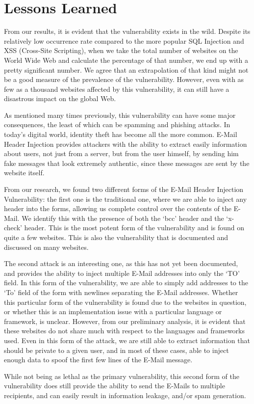 \section{Lessons Learned}
    From our results, it is evident that the vulnerability exists in the wild. Despite its relatively low occurrence rate compared to the more popular SQL Injection and XSS (Cross-Site Scripting), when we take the total number of websites on the World Wide Web and calculate the percentage of that number, we end up with a pretty significant number. We agree that an extrapolation of that kind might not be a good measure of the prevalence of the vulnerability. However, even with as few as a thousand websites affected by this vulnerability, it can still have a disastrous impact on the global Web. 
    
    As mentioned many times previously, this vulnerability can have some major consequences, the least of which can be spamming and phishing attacks. In today's digital world, identity theft has become all the more common. E-Mail Header Injection provides attackers with the ability to extract easily information about users, not just from a server, but from the user himself, by sending him fake messages that look extremely authentic, since these messages are sent by the website itself.
    
    From our research, we found two different forms of the E-Mail Header Injection Vulnerability: the first one is the traditional one, where we are able to inject any header into the forms, allowing us complete control over the contents of the E-Mail. We identify this with the presence of both the `bcc' header and the `x-check' header. This is the most potent form of the vulnerability and is found on quite a few websites. This is also the vulnerability that is documented and discussed on many websites.
    
    The second attack is an interesting one, as this has not yet been documented, and provides the ability to inject multiple E-Mail addresses into only the `TO' field. In this form of the vulnerability, we are able to simply add addresses to the `To' field of the form with newlines separating the E-Mail addresses. Whether this particular form of the vulnerability is found due to the websites in question, or whether this is an implementation issue with a particular language or framework, is unclear. However, from our preliminary analysis, it is evident that these websites do not share much with respect to the languages and frameworks used. 
    Even in this form of the attack, we are still able to extract information that should be private to a given user, and in most of these cases, able to inject enough data to spoof the first few lines of the E-Mail message.
    
    While not being as lethal as the primary vulnerability, this second form of the vulnerability does still provide the ability to send the E-Mails to multiple recipients, and can easily result in information leakage, and/or spam generation.
    
